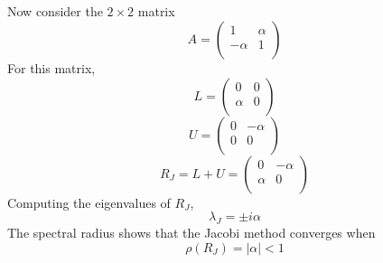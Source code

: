 \documentclass[11pt]{article} %
\begin{document}
\subsection{} %
Now consider the $2 \times 2$ matrix
\begin{equation}
A = \left ( \begin{array}{rr}
1 & \alpha \\
-\alpha & 1 \\
\end{array} \right )
\end{equation}
For this matrix,
\begin{equation}
L =  \left ( \begin{array}{rr}
0 &0 \\
\alpha & 0 \\
\end{array} \right )
\end{equation}
\begin{equation}
U =  \left ( \begin{array}{rr}
0 & -\alpha\\
0 & 0 \\
\end{array} \right )
\end{equation}
\begin{equation}
R_J= L +U  = \left ( \begin{array}{rr}
0 & -\alpha \\
\alpha & 0 \\
\end{array} \right )
\end{equation}
Computing the eigenvalues of $R_J$,
\begin{equation}
\lambda_J =\pm i \alpha
\end{equation}
The spectral radius shows that the Jacobi method converges when
\begin{equation}
\boxed{\rho(R_J) =|  \alpha |< 1}
\end{equation}
\end{document}
